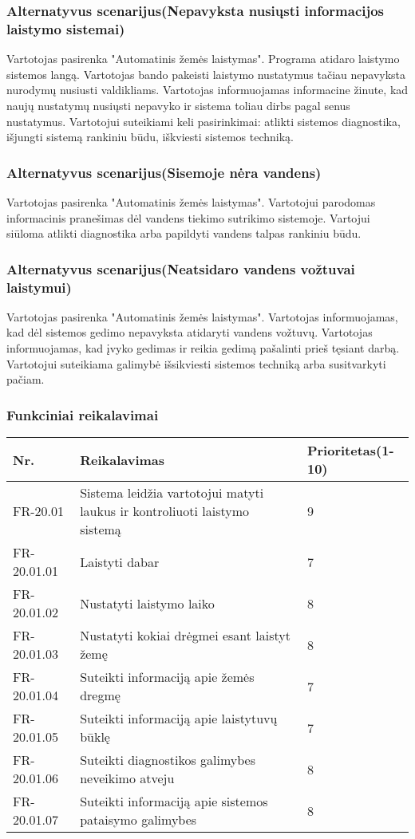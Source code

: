 \documentclass[oneside]{VUMIFPSkursinis}
\begin{document}
	\subsubsection{Alternatyvus scenarijus(Nepavyksta nusiųsti informacijos laistymo sistemai)}
	Vartotojas pasirenka "Automatinis žemės laistymas". Programa atidaro laistymo sistemos langą. Vartotojas bando pakeisti laistymo nustatymus tačiau nepavyksta nurodymų nusiusti valdikliams. Vartotojas informuojamas informacine žinute, kad naujų nustatymų nusiųsti nepavyko ir sistema toliau dirbs pagal senus nustatymus. Vartotojui suteikiami keli pasirinkimai: atlikti sistemos diagnostika, išjungti 	sistemą rankiniu būdu, iškviesti sistemos techniką.
	\subsubsection{Alternatyvus scenarijus(Sisemoje nėra vandens)}
	Vartotojas pasirenka "Automatinis žemės laistymas". Vartotojui parodomas informacinis pranešimas dėl vandens tiekimo sutrikimo sistemoje. Vartojui siūloma atlikti diagnostika arba papildyti vandens talpas rankiniu būdu.
	\subsubsection{Alternatyvus scenarijus(Neatsidaro vandens vožtuvai laistymui)}
	Vartotojas pasirenka "Automatinis žemės laistymas". Vartotojas informuojamas, kad dėl sistemos gedimo nepavyksta atidaryti vandens vožtuvų. Vartotojas informuojamas, kad įvyko gedimas ir reikia gedimą pašalinti prieš tęsiant darbą. Vartotojui suteikiama galimybė išsikviesti sistemos techniką arba susitvarkyti pačiam.
	\subsubsection{Funkciniai reikalavimai}
\begin{table}[htbp]
	\begin{tabularx}{1\textwidth}{ |P{2.5cm}|X|P{3cm }| } \hline
		Nr. & Reikalavimas & Prioritetas(1-10) \\ \hline
		FR-20.01 & Sistema leidžia vartotojui matyti laukus ir kontroliuoti laistymo sistemą & 9 \\ \hline
		FR-20.01.01 & Laistyti dabar & 7 \\ \hline
		FR-20.01.02 & Nustatyti laistymo laiko & 8\\ \hline
		FR-20.01.03 & Nustatyti kokiai drėgmei esant laistyt žemę & 8 \\ \hline
		FR-20.01.04 & Suteikti informaciją apie žemės dregmę & 7 \\ \hline
		FR-20.01.05 & Suteikti informaciją apie laistytuvų būklę & 7 \\ \hline
		FR-20.01.06 & Suteikti diagnostikos galimybes neveikimo atveju & 8 \\ \hline
		FR-20.01.07 & Suteikti informaciją apie sistemos pataisymo galimybes & 8 \\ \hline
	\end{tabularx}
\end{table}
\end{document}
